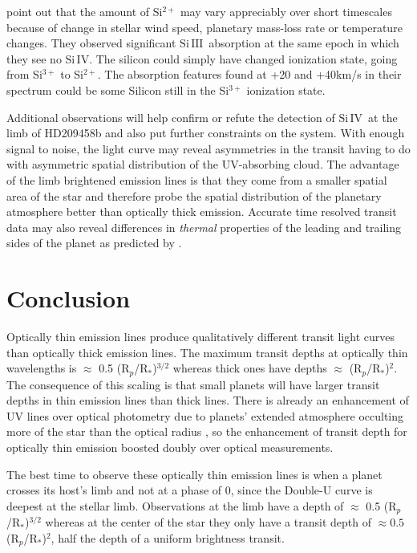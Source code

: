 \documentclass[manuscript]{aastex}
\newcommand{\siIV}{\ensuremath{\mathrm{Si}\,\scriptstyle \mathrm{IV}}}
\newcommand{\siIII}{\ensuremath{\mathrm{Si}\,\scriptstyle \mathrm{III}}}
\newcommand{\p}{R$_p$/R$_*$}
\begin{document}
\citet{linsky} point out that the amount of Si$^{2+}$ may vary appreciably over short timescales because of change in stellar wind speed, planetary mass-loss rate or temperature changes. They observed significant \siIII\ absorption at the same epoch in which they see no \siIV. The silicon could simply have changed ionization state, going from Si$^{3+}$ to Si$^{2+}$. The absorption features found at +20 and +40km/s in their spectrum could be some Silicon still in the Si$^{3+}$ ionization state.

Additional observations will help confirm or refute the detection of \siIV\ at the limb of HD209458b and also put further constraints on the system. With enough signal to noise, the light curve may reveal asymmetries in the transit having to do with asymmetric spatial distribution of the UV-absorbing cloud. The advantage of the limb brightened emission lines is that they come from a smaller spatial area of the star and therefore probe the spatial distribution of the planetary atmosphere better than optically thick emission. Accurate time resolved transit data may also reveal differences in {\it thermal} properties of the leading and trailing sides of the planet as predicted by \citet{fortney}.

\section{Conclusion}

Optically thin emission lines produce qualitatively different transit light curves than optically thick emission lines. The maximum transit depths at optically thin wavelengths is $\approx$ 0.5 (\p )$^{3/2}$ whereas thick ones have depths $\approx$ (\p )$^2$. The consequence of this scaling is that small planets will have larger transit depths in thin emission lines than thick lines. There is already an enhancement of UV lines over optical photometry due  to planets' extended atmosphere occulting more of the star than the optical radius \citep{kosk}, so the enhancement of transit depth for optically thin emission boosted doubly over optical measurements.

The best time to observe these optically thin emission lines is when a planet crosses its host's limb and not at a phase of 0, since the Double-U curve is deepest at the stellar limb. Observations at the limb have a depth of $\approx$ 0.5 (\p )$^{3/2}$ whereas at the center of the star they only have a transit depth of  $\approx 0.5 $(\p)$^2$, half the depth of a uniform brightness transit.
\end{document}
